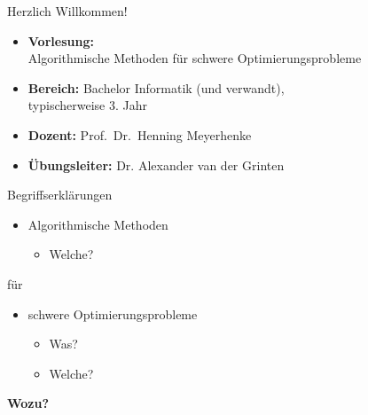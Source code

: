 \begin{frame}{Herzlich Willkommen!}
%
\begin{itemize}
  \item \textbf{Vorlesung:} \\ Algorithmische Methoden für schwere Optimierungsprobleme
\medskip
  \item \textbf{Bereich:} Bachelor Informatik (und verwandt), \\ typischerweise 3. Jahr
\bigskip
  \item \textbf{Dozent:} Prof.\ Dr.\ Henning Meyerhenke
\medskip
  \item \textbf{Übungsleiter:} Dr. Alexander van der Grinten
\end{itemize}
%
\end{frame}


\begin{frame}{Begriffserklärungen}
%
\begin{itemize}
  \item Algorithmische Methoden
  \begin{itemize}
    \item Welche?
  \end{itemize}
\end{itemize}

\medskip
für
\medskip

\begin{itemize}
  \item schwere Optimierungsprobleme
  \begin{itemize}
    \item Was?
    \item Welche?
  \end{itemize}
\end{itemize}
%
\pause
\medskip
%
\textbf{Wozu?}
%
\end{frame}

